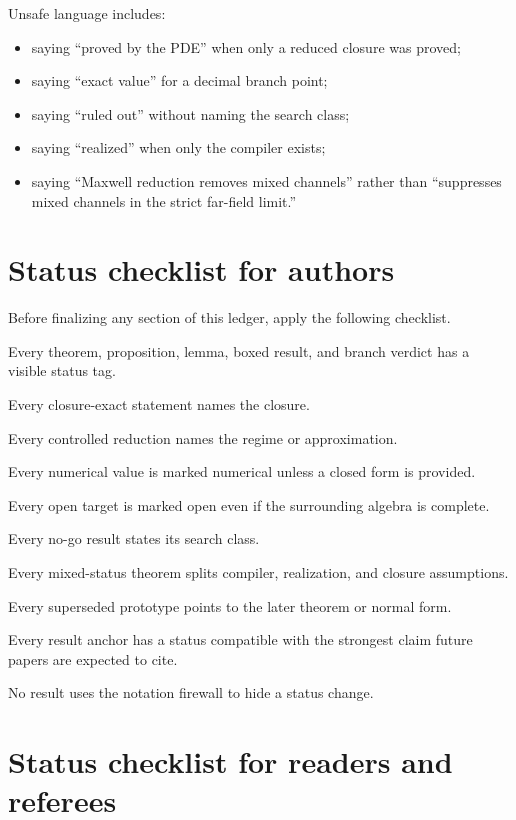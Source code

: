 Unsafe language includes:
\begin{itemize}[leftmargin=2.2em]
  \item saying ``proved by the PDE'' when only a reduced closure was proved;
  \item saying ``exact value'' for a decimal branch point;
  \item saying ``ruled out'' without naming the search class;
  \item saying ``realized'' when only the compiler exists;
  \item saying ``Maxwell reduction removes mixed channels'' rather than ``suppresses mixed channels in the strict far-field limit.''
\end{itemize}

\section{Status checklist for authors}
\label{sec:status-checklist-authors}

Before finalizing any section of this ledger, apply the following checklist.

\begin{verificationchecklist}
  \item Every theorem, proposition, lemma, boxed result, and branch verdict has a visible status tag.
  \item Every closure-exact statement names the closure.
  \item Every controlled reduction names the regime or approximation.
  \item Every numerical value is marked numerical unless a closed form is provided.
  \item Every open target is marked open even if the surrounding algebra is complete.
  \item Every no-go result states its search class.
  \item Every mixed-status theorem splits compiler, realization, and closure assumptions.
  \item Every superseded prototype points to the later theorem or normal form.
  \item Every result anchor has a status compatible with the strongest claim future papers are expected to cite.
  \item No result uses the notation firewall to hide a status change.
\end{verificationchecklist}

\section{Status checklist for readers and referees}
\label{sec:status-checklist-readers}

